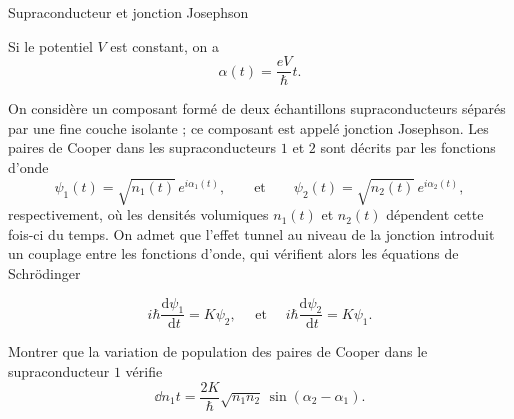 \begin{exo}[PC][3][colle]{Supraconducteur et jonction Josephson}
\begin{quest}
{{      }
      Si le potentiel $V$ est constant, on a 
      $$
      \alpha(t) = \frac{eV}{\hbar}t.
      $$
    }
  \end{quest}
  On considère un composant formé de deux échantillons supraconducteurs séparés par une fine couche isolante ; ce composant est appelé jonction Josephson. Les paires de Cooper dans les supraconducteurs $1$ et $2$ sont décrits par les fonctions d’onde 
  $$\psi_1(t) = \textstyle\sqrt{n_1(t)}\,e^{i\alpha_1(t)}, \qquad\text{et}\qquad \psi_2(t) = \textstyle\sqrt{n_2(t)}\,e^{i\alpha_2(t)},$$ respectivement, où les densités volumiques $n_1(t)$ et $n_2(t)$ dépendent cette fois-ci du temps. On admet que l’effet tunnel au niveau de la jonction introduit un couplage entre les fonctions d’onde, qui vérifient alors les équations  de Schrödinger

\begin{equation}
  i\hbar \frac{\mathrm{d} \psi_1}{\mathrm{~d} t}=K \psi_2, \quad \text { et } \quad i\hbar \frac{\mathrm{d} \psi_2}{\mathrm{~d} t}=K \psi_1.
\end{equation}  
    
    \begin{quest}
    \item 
    Montrer que la variation de population des paires de Cooper dans le supraconducteur $1$ vérifie
    \begin{equation}
      \dd{n_1}{t} = \frac{2K}{\hbar}\sqrt{n_1n_2} \,\sin (\alpha_2-\alpha_1).
    \end{equation}


\end{quest}
\end{exo}
